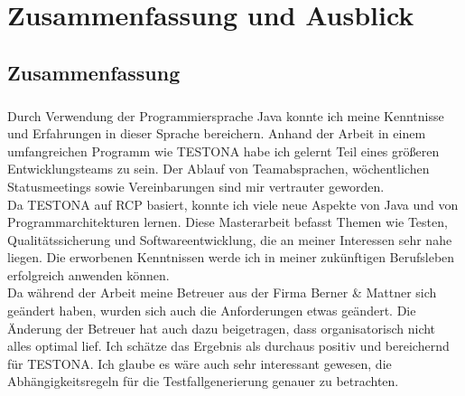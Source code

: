 \chapter{Zusammenfassung und Ausblick}\label{chp:zusammenfassung}



\newpage
\section{Zusammenfassung}
\paragraph{}
Durch Verwendung der Programmiersprache Java konnte ich meine Kenntnisse und Erfahrungen in dieser Sprache bereichern. Anhand der Arbeit in einem umfangreichen Programm wie TESTONA habe ich gelernt Teil eines größeren Entwicklungsteams zu sein. Der Ablauf von Teamabsprachen, wöchentlichen Statusmeetings sowie Vereinbarungen sind mir vertrauter geworden.\\


Da TESTONA auf RCP basiert, konnte ich viele neue Aspekte von Java und von Programmarchitekturen lernen. Diese Masterarbeit befasst Themen wie Testen, Qualitätssicherung und Softwareentwicklung, die an meiner Interessen sehr nahe liegen. Die erworbenen Kenntnissen werde ich in meiner zukünftigen Berufsleben erfolgreich anwenden können.\\


Da während der Arbeit meine Betreuer aus der Firma Berner \& Mattner sich geändert haben, wurden sich auch die Anforderungen etwas geändert. Die Änderung der Betreuer hat auch dazu beigetragen, dass organisatorisch nicht alles optimal lief. Ich schätze das Ergebnis als durchaus positiv und bereichernd für TESTONA. Ich glaube es wäre auch sehr interessant gewesen, die Abhängigkeitsregeln für die Testfallgenerierung genauer zu betrachten.\\


